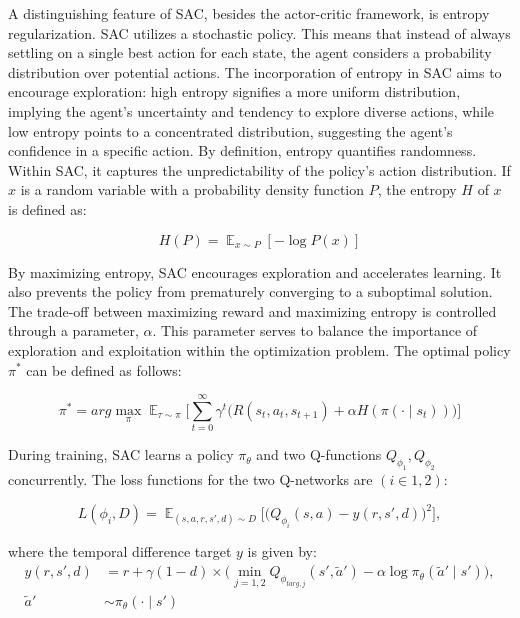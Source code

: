 A distinguishing feature of SAC, besides the actor-critic framework, is entropy regularization. SAC utilizes a stochastic policy. This means that instead of always settling on a single best action for each state, the agent considers a probability distribution over potential actions. The incorporation of entropy in SAC aims to encourage exploration: high entropy signifies a more uniform distribution, implying the agent's uncertainty and tendency to explore diverse actions, while low entropy points to a concentrated distribution, suggesting the agent's confidence in a specific action. By definition, entropy quantifies randomness. Within SAC, it captures the unpredictability of the policy's action distribution. If
\(x\) is a random variable with a probability density function \(P\), the
entropy \(H\) of \(x\) is defined as:

\begin{equation}
 H(P) = \displaystyle \mathop{\mathbb{E}}_{x \sim P}[-\log P(x)]
\end{equation}

By maximizing entropy, SAC encourages exploration and accelerates learning. It
also prevents the policy from prematurely converging to a suboptimal solution.
The trade-off between maximizing reward and maximizing entropy is controlled
through a parameter, \(\alpha\). This parameter serves to balance the importance
of exploration and exploitation within the optimization problem. The optimal policy
\(\pi^*\) can be defined as follows:

\begin{equation}
 \pi^* = {arg}{\max_{\pi}}{\displaystyle
 \mathop{\mathbb{E}}_{\tau\sim\pi}}{\Bigg[{\sum_{t=0}^{\infty}}{\gamma^{t}}{\Big(R(s_t,a_t,s_{t+1})}+{\alpha}H(\pi(\cdot\mid{s_t}))\Big)\Bigg]}
\end{equation}

During training, SAC learns a policy $\pi_{\theta}$ and two Q-functions
$Q_{\phi_1} , Q_{\phi_2}$ concurrently. The loss functions for the two Q-networks are
$(i \in {1, 2})$:

\begin{equation}
  L(\phi_i,D) = \displaystyle
  \mathop{\mathbb{E}}_{(s,a,r,s',d)\sim{D}}\bigg[\bigg(Q_{\phi_i}(s,a)-y(r,s',d)\bigg)^2\bigg],
\end{equation}

where the temporal difference target \(y\) is given by:
\begin{align}
  y(r,s',d) &= r + \gamma(1-d) \times \nonumber\bigg(\displaystyle
  \mathop{\min}_{j=1,2}Q_{\phi_{targ,j}}(s',\tilde{a}')-\alpha\log
  {\pi_\theta}(\tilde{a}'\mid{s}')\bigg), \\
  \tilde{a}'&\sim{\pi_\theta}(\cdot\mid{s'})
\end{align}


